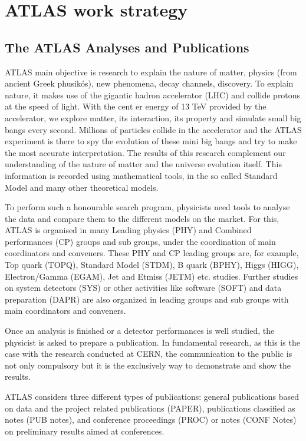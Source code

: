 \section{ATLAS work strategy}
\label{sec:ATLAS_work_strategy}

\subsection{The ATLAS Analyses and Publications}
\label{sec:The_ATLAS_Analyses_and_Publications}
ATLAS main objective is research to explain the nature of matter, physics  (from ancient Greek  phusikós), new phenomena, decay channels, discovery. To explain nature, it makes use of the gigantic hadron accelerator (LHC) and collide protons at the speed of light. With the cent er energy of 13 TeV provided by the accelerator, we explore matter, its interaction, its property and simulate small big bangs every second. Millions of particles collide in the accelerator and the ATLAS experiment is there to spy the evolution of these mini big bangs and try to make the most accurate interpretation. The results of this research complement our understanding of the nature of matter and the universe evolution itself. This information is recorded using mathematical tools, in the so called Standard Model and many other theoretical models.

To perform such a honourable search program, physicists need tools to analyse the data and compare them to the different models on the market. For this, ATLAS is organised in many Leading physics (PHY) and Combined performances (CP) groups and sub groups, under the coordination of main coordinators and conveners. These PHY and CP leading groups are, for example, Top quark (TOPQ), Standard Model (STDM), B quark (BPHY), Higgs (HIGG), Electron/Gamma (EGAM), Jet and Etmiss (JETM) etc. studies. Further studies on system detectors (SYS) or other activities like software (SOFT) and data preparation (DAPR) are also organized in leading groups and sub groups with main coordinators and conveners.

Once an analysis is finished or a detector performances is well studied, the physicist is asked to prepare a publication. In fundamental research, as this is the case with the research conducted at CERN, the communication to the public is not only compulsory but it is the exclusively way to demonstrate and show the results.

ATLAS considers three different types of publications: general publications based on data and the project related publications (PAPER), publications classified as notes (PUB notes), and conference proceedings (PROC) or notes (CONF Notes) on preliminary results aimed at conferences.
                    
